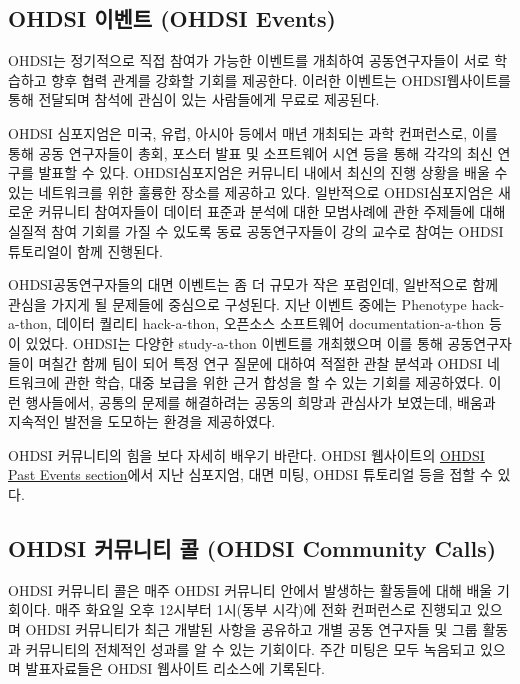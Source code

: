 \documentclass[11pt]{book}
\theoremstyle{definition}
\theoremstyle{definition}
\theoremstyle{definition}
\theoremstyle{remark}
\begin{document}
\subsection{OHDSI 이벤트 (OHDSI Events)}\label{ohdsi--ohdsi-events}

OHDSI는 정기적으로 직접 참여가 가능한 이벤트를 개최하여 공동연구자들이
서로 학습하고 향후 협력 관계를 강화할 기회를 제공한다. 이러한 이벤트는
OHDSI웹사이트를 통해 전달되며 참석에 관심이 있는 사람들에게 무료로
제공된다.

OHDSI 심포지엄은 미국, 유럽, 아시아 등에서 매년 개최되는 과학
컨퍼런스로, 이를 통해 공동 연구자들이 총회, 포스터 발표 및 소프트웨어
시연 등을 통해 각각의 최신 연구를 발표할 수 있다. OHDSI심포지엄은
커뮤니티 내에서 최신의 진행 상황을 배울 수 있는 네트워크를 위한 훌륭한
장소를 제공하고 있다. 일반적으로 OHDSI심포지엄은 새로운 커뮤니티
참여자들이 데이터 표준과 분석에 대한 모범사례에 관한 주제들에 대해
실질적 참여 기회를 가질 수 있도록 동료 공동연구자들이 강의 교수로 참여는
OHDSI 튜토리얼이 함께 진행된다.

OHDSI공동연구자들의 대면 이벤트는 좀 더 규모가 작은 포럼인데, 일반적으로
함께 관심을 가지게 될 문제들에 중심으로 구성된다. 지난 이벤트 중에는
Phenotype hack-a-thon, 데이터 퀄리티 hack-a-thon, 오픈소스 소프트웨어
documentation-a-thon 등이 있었다. OHDSI는 다양한 study-a-thon 이벤트를
개최했으며 이를 통해 공동연구자들이 며칠간 함께 팀이 되어 특정 연구
질문에 대하여 적절한 관찰 분석과 OHDSI 네트워크에 관한 학습, 대중 보급을
위한 근거 합성을 할 수 있는 기회를 제공하였다. 이런 행사들에서, 공통의
문제를 해결하려는 공동의 희망과 관심사가 보였는데, 배움과 지속적인
발전을 도모하는 환경을 제공하였다.

OHDSI 커뮤니티의 힘을 보다 자세히 배우기 바란다. OHDSI 웹사이트의
\href{https://www.ohdsi.org/past-events/}{OHDSI Past Events section}에서
지난 심포지엄, 대면 미팅, OHDSI 튜토리얼 등을 접할 수 있다.

\subsection{OHDSI 커뮤니티 콜 (OHDSI Community
Calls)}\label{ohdsi---ohdsi-community-calls}

OHDSI 커뮤니티 콜은 매주 OHDSI 커뮤니티 안에서 발생하는 활동들에 대해
배울 기회이다. 매주 화요일 오후 12시부터 1시(동부 시각)에 전화
컨퍼런스로 진행되고 있으며 OHDSI 커뮤니티가 최근 개발된 사항을 공유하고
개별 공동 연구자들 및 그룹 활동과 커뮤니티의 전체적인 성과를 알 수 있는
기회이다. 주간 미팅은 모두 녹음되고 있으며 발표자료들은 OHDSI 웹사이트
리소스에 기록된다.
\end{document}
